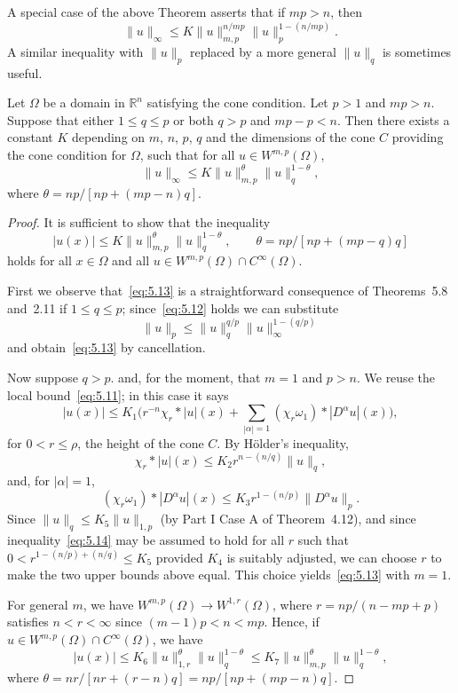A special case of the above Theorem asserts that if $mp>n$, then
\begin{equation}\label{eq:5.12}
  \|u\|_\infty \leq K \|u\|_{m,p}^{n/mp} \|u\|_p^{1-(n/mp)}.
\end{equation}
A similar inequality with $\|u\|_p$ replaced by a more general $\|u\|_q$
is sometimes useful.

\begin{theorem}
  Let $\Omega$ be a domain in $\mathbb{R}^n$ satisfying the cone condition.
  Let $p>1$ and $mp>n$. Suppose that either $1\leq q\leq p$ or both $q>p$
  and $mp-p<n$. Then there exists a constant $K$ depending on $m$, $n$, $p$,
  $q$ and the dimensions of the cone $C$ providing the cone condition for
  $\Omega$, such that for all $u\in W^{m,p}(\Omega)$,
  \[ \|u\|_\infty \leq K\|u\|_{m,p}^\theta \|u\|_q^{1-\theta}, \]
  where $\theta = np/[np+(mp-n)q]$.
\end{theorem}

\begin{proof}
  It is sufficient to show that the inequality
  \begin{equation}\label{eq:5.13}
    |u(x)|\leq K\|u\|_{m,p}^\theta \|u\|_q^{1-\theta},
      \qquad \theta = np/[np+(mp-q)q]
  \end{equation}
  holds for all $x\in\Omega$ and all $u\in W^{m,p}(\Omega)\cap C^\infty(\Omega)$.

  First we observe that~\eqref{eq:5.13} is a straightforward consequence
  of Theorems~5.8 and~2.11 if $1\leq q\leq p$; since~\eqref{eq:5.12} holds
  we can substitute
  \[ \|u\|_p \leq \|u\|_q^{q/p} \|u\|_{\infty}^{1-(q/p)} \]
  and obtain~\eqref{eq:5.13} by cancellation.

  Now suppose $q>p$. and, for the moment, that $m=1$ and $p>n$. We reuse
  the local bound~\eqref{eq:5.11}; in this case it says
  \[ |u(x)| \leq K_1 \biggl( r^{-n} \chi_r * |u|(x) 
      + \sum_{|\alpha|=1} (\chi_r\omega_1) * |D^\alpha u|(x)\biggr), \]
  for $0<r\leq\rho$, the height of the cone $C$. By H\"older's inequality,
  \[ \chi_r * |u|(x) \leq K_2 r^{n-(n/q)} \|u\|_q, \]
  and, for $|\alpha|=1$,
  \begin{equation}\label{eq:5.14}
    (\chi_r\omega_1) * |D^\alpha u|(x) \leq K_3 r^{1-(n/p)} \|D^\alpha u\|_p.
  \end{equation}
  Since $\|u\|_q \leq K_5 \|u\|_{1,p}$ (by Part I Case A of Theorem~4.12),
  and since inequality~\eqref{eq:5.14} may be assumed to hold for all $r$
  such that $0<r^{1-(n/p)+(n/q)}\leq K_5$ provided $K_4$ is suitably adjusted,
  we can choose $r$ to make the two upper bounds above equal. This choice yields~\eqref{eq:5.13}
  with $m=1$.

  For general $m$, we have $W^{m,p}(\Omega) \to W^{1,r}(\Omega)$, where
  $r = np/(n-mp+p)$ satisfies $n<r<\infty$ since $(m-1)p<n<mp$. Hence,
  if $u\in W^{m,p}(\Omega)\cap C^\infty(\Omega)$, we have
  \[ |u(x)| \leq K_6 \|u\|_{1,r}^\theta \|u\|_q^{1-\theta} 
      \leq K_7 \|u\|_{m,p}^\theta \|u\|_q^{1-\theta}, \]
  where $\theta = nr/[nr+(r-n)q] = np/[np+(mp-n)q]$.
\end{proof}


